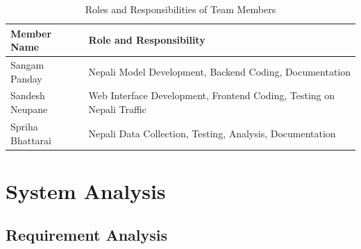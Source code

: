 \documentclass[12pt,a4paper]{report}
\begin{document}
\begin{table}[H]
\centering
\begin{tabular}{|l|l|}
\hline
\textbf{Member Name} & \textbf{Role and Responsibility} \\ \hline
Sangam Panday & Nepali Model Development, Backend Coding, Documentation \\ \hline
Sandesh Neupane & Web Interface Development, Frontend Coding, Testing on Nepali Traffic \\ \hline
Spriha Bhattarai & Nepali Data Collection, Testing, Analysis, Documentation \\ \hline
\end{tabular}
\caption{Roles and Responsibilities of Team Members}
\label{table:roles_responsibilities}
\end{table}


\chapter{System Analysis}

\section{Requirement Analysis}
\end{document}
